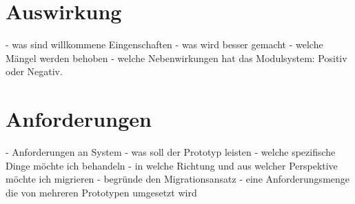 \section{Auswirkung} \label{auswirkung}
	- was sind willkommene Eingenschaften 
	- was wird besser gemacht 
	- welche Mängel werden behoben 
	- welche Nebenwirkungen hat das Modulsystem: Positiv oder Negativ. 

\section{Anforderungen} \label{sec:anforderungen}
- Anforderungen an System 
	- was soll der Prototyp leisten 
	- welche spezifische Dinge möchte ich behandeln 
	- in welche Richtung und aus welcher Perspektive möchte ich migrieren 
	- begründe den Migrationsansatz 
	- eine Anforderungsmenge die von mehreren Prototypen umgesetzt wird 






